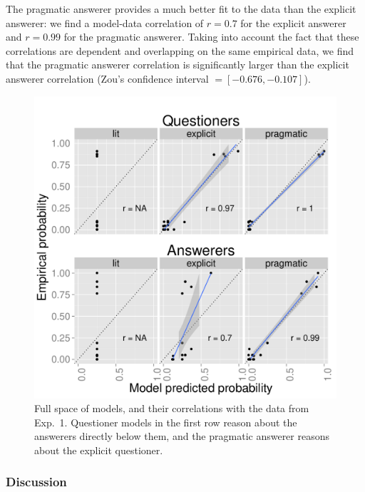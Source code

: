 \documentclass[12pt, floatsintext, man]{apa6}
\begin{document}
The pragmatic answerer provides a much better fit to the data than the explicit answerer: we find a model-data correlation of $r = 0.7$ for the explicit answerer and $r = 0.99$ for the pragmatic answerer.  Taking into account the fact that these correlations are dependent and overlapping on the same empirical data, we find that the pragmatic answerer correlation is significantly larger than the explicit answerer correlation (Zou's confidence interval $= [-0.676, -0.107]$). 
%
\begin{figure}[t!]
\begin{center}
\includegraphics[scale=.75]{Exp3ModelFits.pdf}
\end{center}
\vspace{-.5cm}
\caption{Full space of models, and their correlations with the data from Exp.~1. Questioner models in the first row reason about the answerers directly below them, and the pragmatic answerer reasons about the explicit questioner.}
\label{fig:Exp3ModelSpace}
\vspace{-.15cm}
\end{figure}
%

\subsubsection{Discussion}
\end{document}
